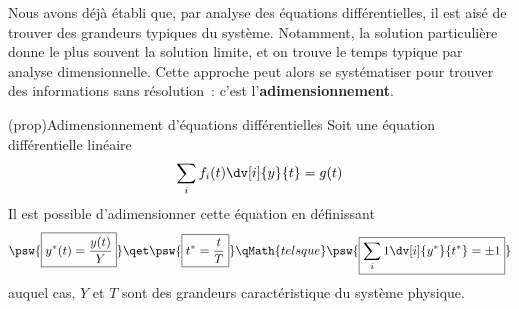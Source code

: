 \documentclass[../../main/main.tex]{subfiles}
\begin{document}
Nous avons déjà établi que, par analyse des équations différentielles, il est
aisé de trouver des grandeurs typiques du système. Notamment, la solution
particulière donne le plus souvent la solution limite, et on trouve le temps
typique par analyse dimensionnelle. Cette approche peut alors se systématiser
pour trouver des informations sans résolution~: c'est
l'\textbf{adimensionnement}.

\begin{tcb*}[list entry={\lte\theprop~:~Adimensionnement d'ED}]
	(prop){Adimensionnement d'équations différentielles}
	Soit une équation différentielle linéaire
	\[
		\sum_{i} f_i(t) \dv[i]{y}{t} = g(t)
	\]
	Il est possible d'adimensionner cette équation en définissant
	\[
		\psw{\boxed{y^*(t) = \frac{y(t)}{Y}}}
		\qet
		\psw{\boxed{t^* = \frac{t}{T}}}
		\qMath{tels que}
		\psw{\boxed{\sum_{i} 1 \dv[i]{{y^*}}{{t^*}} = \pm 1}}
	\]
	auquel cas, $Y$ et $T$ sont des grandeurs caractéristique du système physique.
	\begin{center}
	\end{center}
\end{tcb*}
\end{document}
